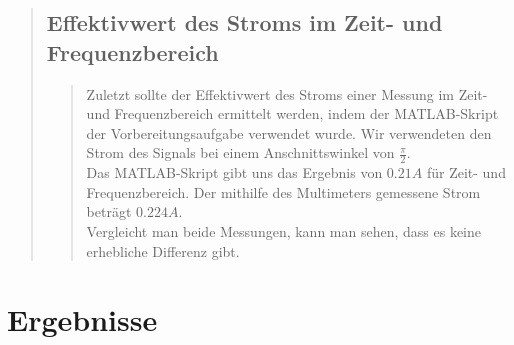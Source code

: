 \begin{quote}
	\subsection{Effektivwert des Stroms im Zeit- und Frequenzbereich}
	\begin{quote}
	Zuletzt sollte der Effektivwert des Stroms einer Messung im Zeit- und
	Frequenzbereich ermittelt werden, indem der MATLAB-Skript der
	Vorbereitungsaufgabe verwendet wurde. Wir verwendeten den Strom des Signals bei
	einem Anschnittswinkel von $\frac{\pi}{2}$.\\
	Das MATLAB-Skript gibt uns das Ergebnis von $0.21 A$ für Zeit- und
	Frequenzbereich. Der mithilfe des Multimeters gemessene Strom beträgt $0.224
	A$.\\
	
	Vergleicht man beide Messungen, kann man sehen, dass es keine erhebliche
	Differenz gibt.
	
	 
	\end{quote}
\end{quote}


\section{Ergebnisse}
\begin{quote}
	
\end{quote}

